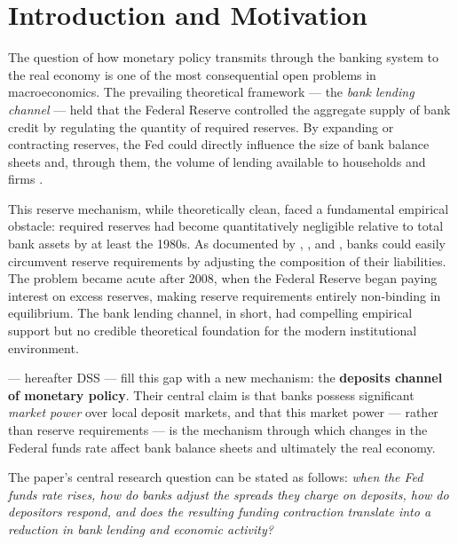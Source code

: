 \documentclass[12pt,a4paper]{article}
\begin{document}
\tableofcontents
\newpage

\section{Introduction and Motivation}

The question of how monetary policy transmits through the banking system to
the real economy is one of the most consequential open problems in
macroeconomics. The prevailing theoretical framework --- the \emph{bank
lending channel} --- held that the Federal Reserve controlled the aggregate
supply of bank credit by regulating the quantity of required reserves. By
expanding or contracting reserves, the Fed could directly influence the size
of bank balance sheets and, through them, the volume of lending available to
households and firms \citep{bernanke_blinder_1988}.

This reserve mechanism, while theoretically clean, faced a fundamental
empirical obstacle: required reserves had become quantitatively negligible
relative to total bank assets by at least the 1980s. As documented by
\citet{romer_romer_1990}, \citet{bernanke_gertler_1995}, and
\citet{woodford_2010}, banks could easily circumvent reserve requirements by
adjusting the composition of their liabilities. The problem became acute
after 2008, when the Federal Reserve began paying interest on excess reserves,
making reserve requirements entirely non-binding in equilibrium. The bank
lending channel, in short, had compelling empirical support but no credible
theoretical foundation for the modern institutional environment.

\citet{dss2017} --- hereafter DSS --- fill this gap with a new mechanism: the
\textbf{deposits channel of monetary policy}. Their central claim is that banks
possess significant \emph{market power} over local deposit markets, and that
this market power --- rather than reserve requirements --- is the mechanism
through which changes in the Federal funds rate affect bank balance sheets and
ultimately the real economy.

The paper's central research question can be stated as follows: \emph{when
the Fed funds rate rises, how do banks adjust the spreads they charge on
deposits, how do depositors respond, and does the resulting funding contraction
translate into a reduction in bank lending and economic activity?}
\end{document}
